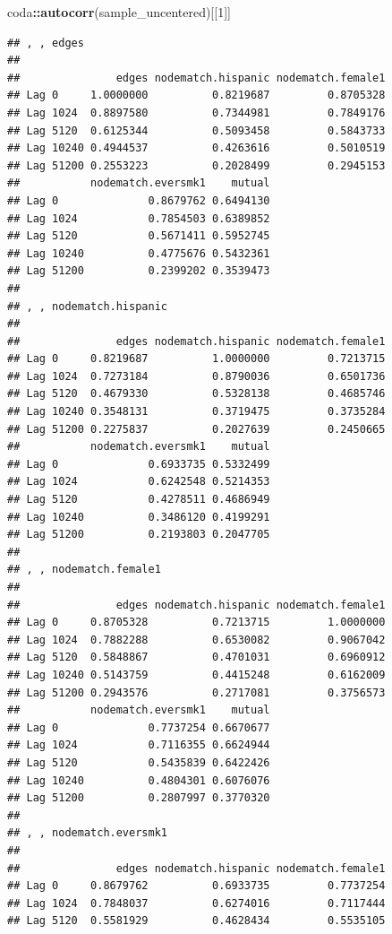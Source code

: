 \documentclass[]{book}
\newenvironment{Shaded}{\begin{snugshade}}{\end{snugshade}}
\newcommand{\KeywordTok}[1]{\textcolor[rgb]{0.13,0.29,0.53}{\textbf{#1}}}
\newcommand{\DecValTok}[1]{\textcolor[rgb]{0.00,0.00,0.81}{#1}}
\newcommand{\OperatorTok}[1]{\textcolor[rgb]{0.81,0.36,0.00}{\textbf{#1}}}
\newcommand{\NormalTok}[1]{#1}
\theoremstyle{definition}
\theoremstyle{definition}
\theoremstyle{definition}
\theoremstyle{remark}
\begin{document}
\begin{enumerate}
\begin{Shaded}
\begin{Highlighting}[]
\NormalTok{coda}\OperatorTok{::}\KeywordTok{autocorr}\NormalTok{(sample_uncentered)[[}\DecValTok{1}\NormalTok{]]}
\end{Highlighting}
\end{Shaded}

\begin{verbatim}
## , , edges
## 
##               edges nodematch.hispanic nodematch.female1
## Lag 0     1.0000000          0.8219687         0.8705328
## Lag 1024  0.8897580          0.7344981         0.7849176
## Lag 5120  0.6125344          0.5093458         0.5843733
## Lag 10240 0.4944537          0.4263616         0.5010519
## Lag 51200 0.2553223          0.2028499         0.2945153
##           nodematch.eversmk1    mutual
## Lag 0              0.8679762 0.6494130
## Lag 1024           0.7854503 0.6389852
## Lag 5120           0.5671411 0.5952745
## Lag 10240          0.4775676 0.5432361
## Lag 51200          0.2399202 0.3539473
## 
## , , nodematch.hispanic
## 
##               edges nodematch.hispanic nodematch.female1
## Lag 0     0.8219687          1.0000000         0.7213715
## Lag 1024  0.7273184          0.8790036         0.6501736
## Lag 5120  0.4679330          0.5328138         0.4685746
## Lag 10240 0.3548131          0.3719475         0.3735284
## Lag 51200 0.2275837          0.2027639         0.2450665
##           nodematch.eversmk1    mutual
## Lag 0              0.6933735 0.5332499
## Lag 1024           0.6242548 0.5214353
## Lag 5120           0.4278511 0.4686949
## Lag 10240          0.3486120 0.4199291
## Lag 51200          0.2193803 0.2047705
## 
## , , nodematch.female1
## 
##               edges nodematch.hispanic nodematch.female1
## Lag 0     0.8705328          0.7213715         1.0000000
## Lag 1024  0.7882288          0.6530082         0.9067042
## Lag 5120  0.5848867          0.4701031         0.6960912
## Lag 10240 0.5143759          0.4415248         0.6162009
## Lag 51200 0.2943576          0.2717081         0.3756573
##           nodematch.eversmk1    mutual
## Lag 0              0.7737254 0.6670677
## Lag 1024           0.7116355 0.6624944
## Lag 5120           0.5435839 0.6422426
## Lag 10240          0.4804301 0.6076076
## Lag 51200          0.2807997 0.3770320
## 
## , , nodematch.eversmk1
## 
##               edges nodematch.hispanic nodematch.female1
## Lag 0     0.8679762          0.6933735         0.7737254
## Lag 1024  0.7848037          0.6274016         0.7117444
## Lag 5120  0.5581929          0.4628434         0.5535105

\end{verbatim}
\end{enumerate}
\end{document}
